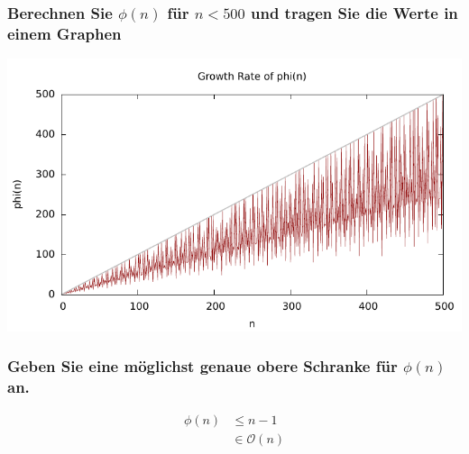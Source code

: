 \subsubsection{Berechnen Sie $\phi(n)$ für $n < 500$ und tragen Sie die Werte in einem Graphen}

\includegraphics[scale=1]{eclipse/growth-rate.pdf}

\subsubsection{Geben Sie eine möglichst genaue obere Schranke für $\phi(n)$ an.}

\begin{align}
	 \phi(n) &\le n-1 \\
	 & \in \mathcal{O}(n)
\end{align}	
